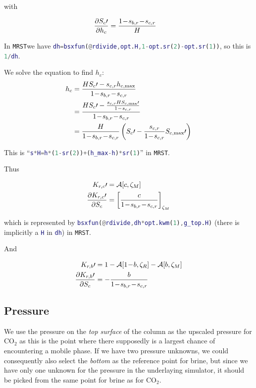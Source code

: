 \documentclass[12pt]{scrartcl}
\newcommand{\mth}[1]{\ensuremath{#1}\xspace}
\newcommand{\COO}{\mth{\mathrm{CO}_2}}
\newcommand{\MRST}{{\tt MRST}}
\newcommand{\aleft}{\mathopen{}\mathclose\bgroup\left}  %
\newcommand{\aright}{\aftergroup\egroup\right}          %
\newcommand{\binop}[3]{#1\mkern1mu{#2}\mkern1mu #3}     %
\newcommand{\dual}[1]{\binop{1}{-}{#1}}                 %
\newcommand{\ddual}[2]{\binop{\binop{1}{-}{#1}}{-}{#2}} %
\newcommand{\at}[2]{\left[ #1 \right]_{#2}}             %
\newcommand{\der}[2]{\frac{\partial{#1}}{\partial{#2}}}       %
\newcommand{\Hei}{H}        %
\newcommand{\hei}{h}        %
\newcommand{\Sat}{S}        %
\newcommand{\sat}{s}        %
\newcommand{\sr}[1]{\sat_{#1,r}}    %
\newcommand{\Rlp}[1]{K_{r,#1}}  %
\newcommand{\Lev}{\zeta}    %
\newcommand{\Res}{R}        %
\newcommand{\Mob}{M}        %
\newcommand{\nap}{c}        %
\newcommand{\wet}{b}        %
\newcommand{\avg}[2]{\mathcal{A}\aleft[#1, #2\aright]}  %
\newcommand{\krnwr}{c}      %
\newcommand{\krwnr}{b}      %
\newcommand{\Satn}{\Sat_\nap}
\newcommand{\Satnmax}{\Sat_{\nap,\max}} %
\newcommand{\snr}{\sr{\nap}}    %
\newcommand{\swr}{\sr{\wet}}    %
\newcommand{\LevM}{\Lev_\Mob}
\newcommand{\LevR}{\Lev_\Res}
\newcommand{\hnap}{\hei_\nap}           %
\newcommand{\hnmax}{\hei_{\nap,\max}}   %
\newcommand{\Rlpn}{\Rlp{\nap}}  %
\newcommand{\Rlpw}{\Rlp{\wet}}  %
\begin{document}
with

\begin{align}
\der{ \Satn \prime }{ \hnap } &= \frac{ \ddual{ \swr }{ \snr } }{ \Hei }
\end{align}

In \MRST we have \lstinline[language=Matlab]!dh=bsxfun(@rdivide,opt.H,1-opt.sr(2)-opt.sr(1))!, so this is \lstinline[language=Matlab]!1/dh!.

We solve the equation to find \( \hnap \):
\begin{align}
\hnap &= \frac{ \Hei \Satn \prime - \snr \hnmax }{ \ddual{ \swr }{ \snr } } \\
&= \frac{ \Hei \Satn \prime - \frac{ \snr \Hei \Satnmax \prime }{ \dual{ \snr } } }{ \ddual{ \swr }{ \snr } } \\
&= \frac{ \Hei }{ \ddual{ \swr }{ \snr } } \left( \Satn \prime - \frac{ \snr }{ \dual{ \snr } } \Satnmax \prime \right)
\end{align}

This is ``\lstinline[language=Matlab]!s*H=h*(1-sr(2))+(h_max-h)*sr(1)!'' in \MRST.

Thus

\begin{align}
\Rlpn \prime &= \avg{ \krnwr }{ \LevM } \\
\der{ \Rlpn \prime }{ \Satn } &= \at{ \frac{ \krnwr }{ \ddual{ \swr }{ \snr } } }{ \LevM }
\end{align}

which is represented by \lstinline[language=Matlab]!bsxfun(@rdivide,dh*opt.kwm(1),g_top.H)! (there is implicitly a \lstinline[language=Matlab]!H! in \lstinline[language=Matlab]!dh!) in \MRST.

And

\begin{align}
\Rlpw \prime &= 1 - \avg{ \dual{ \krwnr } }{ \LevR } - \avg{ \krwnr }{ \LevM } \\
\der{ \Rlpw \prime }{ \Satn } &= - \frac{ \krwnr }{ \ddual{ \swr }{ \snr } }
\end{align}

\subsection{Pressure}
We use the pressure on the \emph{top surface} of the column as the upscaled pressure for \COO as this is the point where there supposedly is a largest chance of encountering a mobile phase. If we have two pressure unknowns, we could consequently also select the \emph{bottom} as the reference point for brine, but since we have only one unknown for the pressure in the underlaying simulator, it should be picked from the same point for brine as for \COO.
\end{document}
